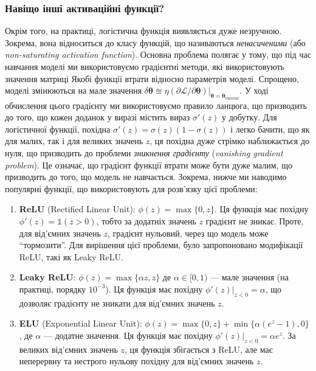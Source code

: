 \subsubsection{Навіщо інші активаційні функції?}
Окрім того, на практиці, логістична функція виявляється дуже незручною. Зокрема,
вона відноситься до класу функцій, що називаються \textit{ненасиченими} (або
\textit{non-saturating activation function}). Основна проблема полягає у тому,
що під час навчання моделі ми використовуємо градієнтні методи, які
використовують значення матриці Якобі функції втрати відносно параметрів
моделі. Спрощено, моделі змінюються на мале значення $\delta\boldsymbol{\theta}
\approxeq \eta
(\partial\mathcal{L}/\partial\boldsymbol{\theta})\Big|_{\boldsymbol{\theta}=\boldsymbol{\theta}_{\text{current}}}$.
У ході обчислення цього градієнту ми використовуємо правило ланцюга, що
призводить до того, що кожен доданок у виразі містить вираз $\sigma'(z)$ у
добутку. Для логістичної функції, похідна $\sigma'(z) = \sigma(z)(1-\sigma(z))$
і легко бачити, що як для малих, так і для великих значень $z$, ця похідна дуже
стрімко наближається до нуля, що призводить до проблеми \textit{зникнення
градієнту} (\textit{vanishing gradient problem}). Це означає, що градієнт
функції втрати може бути дуже малим, що призводить до того, що модель не
навчається. Зокрема, нижче ми наводимо популярні функції, що використовують для
розв'язку цієї проблеми:
\begin{enumerate}
	\item \textbf{ReLU} (Rectified Linear Unit): $\phi(z) = \max\{0,z\}$. Ця
	функція має похідну $\phi'(z) = \mathds{1}(z>0)$, тобто за додатніх значень
	$z$ градієнт не зникає. Проте, для від'ємних значень $z$, градієнт нульовий,
	через що модель може ``тормозити''. Для вирішення цієї проблеми, було
	запропоновано модифікації ReLU, такі як Leaky ReLU.
	\item \textbf{Leaky ReLU}: $\phi(z) = \max\{\alpha z,z\}$ де $\alpha \in
	[0,1)$ --- мале значення (на практиці, порядку $10^{-3}$). Ця функція має
	похідну $\phi'(z)\Big|_{z<0} = \alpha$, що дозволяє градієнту не зникати для
	від'ємних значень $z$.
	\item \textbf{ELU} (Exponential Linear Unit): $\phi(z) =
	\max\{0,z\}+\min\{\alpha(e^z-1),0\}$, де $\alpha$ --- додатне значення. Ця
	функція має похідну $\phi'(z)\Big|_{z<0} = \alpha e^z$. За великих від'ємних
	значень $z$, ця функція збігається з ReLU, але має неперервну та нестрого
	нульову похідну для від'ємних значень $z$.
\end{enumerate}

